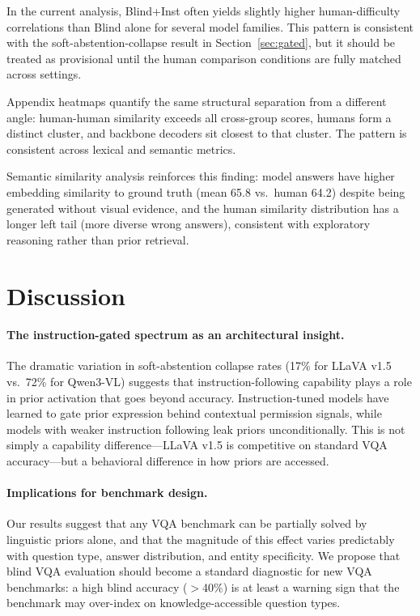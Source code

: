 \documentclass[letterpaper]{article}
\begin{document}
In the current analysis, Blind+Inst often yields slightly higher
human-difficulty correlations than Blind alone for several model families.
This pattern is consistent with the soft-abstention-collapse result in
Section~\ref{sec:gated}, but it should be treated as provisional until the
human comparison conditions are fully matched across settings.

Appendix heatmaps quantify the same structural separation from a different
angle: human-human similarity exceeds all cross-group scores, humans form a
distinct cluster, and backbone decoders sit closest to that cluster. The
pattern is consistent across lexical and semantic metrics.

Semantic similarity analysis reinforces this finding: model answers have
higher embedding similarity to ground truth (mean 65.8 vs.\ human 64.2)
despite being generated without visual evidence, and the human similarity
distribution has a longer left tail (more diverse wrong answers), consistent
with exploratory reasoning rather than prior retrieval.

\section{Discussion}

\paragraph{The instruction-gated spectrum as an architectural insight.}
The dramatic variation in soft-abstention collapse rates (17\% for LLaVA v1.5
vs.\ 72\% for Qwen3-VL) suggests that instruction-following capability plays
a role in prior activation that goes beyond accuracy. Instruction-tuned models
have learned to gate prior expression behind contextual permission signals, while
models with weaker instruction following leak priors unconditionally. This is
not simply a capability difference---LLaVA v1.5 is competitive on standard VQA
accuracy---but a behavioral difference in how priors are accessed.

\paragraph{Implications for benchmark design.}
Our results suggest that any VQA benchmark can be partially solved by
linguistic priors alone, and that the magnitude of this effect varies
predictably with question type, answer distribution, and entity specificity.
We propose that blind VQA evaluation should become a standard diagnostic for
new VQA benchmarks: a high blind accuracy ($>$40\%) is at least a warning sign
that the benchmark may over-index on knowledge-accessible question types.
\end{document}
